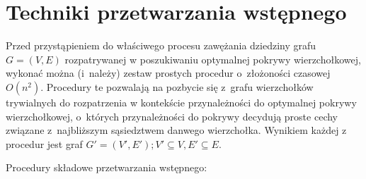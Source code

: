 \section{Techniki przetwarzania wstępnego}\label{Section_preprocessing}

Przed przystąpieniem do właściwego procesu zawężania dziedziny grafu $G=(V,E)$
rozpatrywanej w poszukiwaniu optymalnej pokrywy wierzchołkowej, wykonać można 
(i~należy) zestaw prostych procedur o~złożoności czasowej $O(n^2)$.
Procedury te pozwalają na pozbycie się z~grafu wierzchołków trywialnych do 
rozpatrzenia w kontekście przynależności do optymalnej pokrywy wierzchołkowej,
o~których przynależności do pokrywy decydują proste cechy związane
z~najbliższym sąsiedztwem danwego wierzchołka.
Wynikiem każdej z procedur jest graf $G\prime=(V\prime, E\prime); V\prime
\subseteq V, E\prime \subseteq E$.


Procedury składowe przetwarzania wstępnego:

